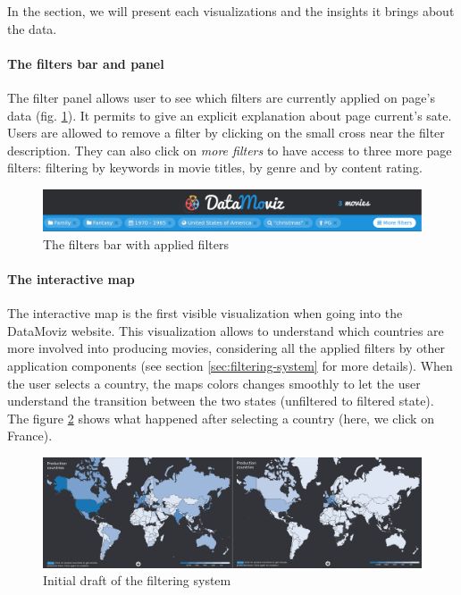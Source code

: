\documentclass[a4paper,10pt]{article}
\begin{document}
In the section, we will present each visualizations and the insights it brings about
the data.

\paragraph{The filters bar and panel} The filter panel allows user to see which filters are
currently applied on page's data (fig. \ref{fig:filters-bar}). It permits to give an explicit explanation about
page current's sate. Users are allowed to remove a filter by clicking on the small
cross near the filter description. They can also click on \textit{more filters} to
have access to three more page filters: filtering by keywords in movie titles,
by genre and by content rating.

\begin{figure}[ht]
  \centering
  \includegraphics[width=1\linewidth]{images/screens/filters-bar-example.png}
  \caption{The filters bar with applied filters} \label{fig:filters-bar}
\end{figure}

\paragraph{The interactive map} The interactive map is the first visible visualization
when going into the DataMoviz website. This visualization allows to understand which
countries are more involved into producing movies, considering all the applied filters
by other application components (see section \ref{sec:filtering-system} for more details).
When the user selects a country, the maps colors changes smoothly to let the user understand
the transition between the two states (unfiltered to filtered state). The figure \ref{fig:country-selection}
shows what happened after selecting a country (here, we click on France).

\begin{figure}[ht]
  \centering
  \includegraphics[width=1\linewidth]{images/screens/country-selection.png}
  \caption{Initial draft of the filtering system} \label{fig:country-selection}
\end{figure}
\end{document}
